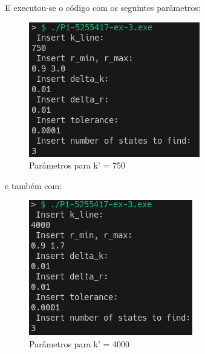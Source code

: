\documentclass[12pt, a4paper]{article} %
\begin{document}
            E executou-se o código com os seguintes parâmetros:
            \begin{figure}[H]
                \centering
                \includegraphics[scale=0.7]{../images/ex3-750-parameters.png}
                \caption{Par\^ametros para k' = 750}
            \end{figure}
            e tamb\'em com:
            \begin{figure}[H]
                \centering
                \includegraphics[scale=0.7]{../images/ex3-4000-parameters.png}
                \caption{Par\^ametros para k' = 4000}
            \end{figure}
              
\end{document}
